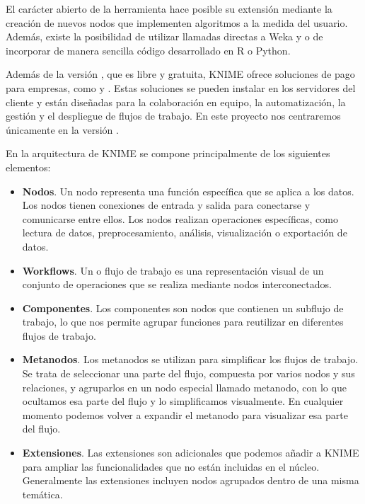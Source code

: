 El carácter abierto de la herramienta hace posible su extensión mediante la creación de nuevos nodos que 
implementen algoritmos a la medida del usuario. Además, existe la posibilidad de utilizar llamadas directas a Weka y 
o de incorporar de manera sencilla código desarrollado en R o Python.
\

Además de la versión , que es libre y gratuita, KNIME ofrece soluciones de pago para empresas, como  
y . Estas soluciones se pueden instalar en los servidores del cliente y están diseñadas para la 
colaboración en equipo, la automatización, la gestión y el despliegue de flujos de trabajo. En este proyecto nos centraremos únicamente
en la versión . 
\

En la arquitectura de KNIME se compone principalmente de los siguientes elementos: 

\begin{itemize}
	\item \textbf{Nodos}. Un nodo representa una función específica que se aplica a los datos. Los nodos tienen conexiones de
	 entrada y salida para conectarse y comunicarse entre ellos. Los nodos realizan operaciones específicas, 
	 como lectura de datos, preprocesamiento, análisis, visualización o exportación de datos. 
	\item \textbf{Workflows}. Un  o flujo de trabajo es una representación visual de un conjunto de operaciones que se realiza 
	mediante nodos interconectados. 
	\item \textbf{Componentes}. Los componentes son nodos que contienen un subflujo de trabajo, lo que nos permite agrupar 
	funciones para reutilizar en diferentes flujos de trabajo. 	
	\item \textbf{Metanodos}. Los metanodos se utilizan para simplificar los flujos de trabajo. Se trata de seleccionar una parte del flujo, 
	compuesta por varios nodos y sus relaciones, y agruparlos en un nodo especial llamado metanodo, con lo que ocultamos esa parte del flujo 
	y lo simplificamos visualmente. En cualquier momento podemos volver a expandir el metanodo para visualizar esa parte del flujo. 
	\item \textbf{Extensiones}. Las extensiones son  adicionales que podemos añadir a KNIME para ampliar las funcionalidades que 
	no están incluidas en el núcleo. Generalmente las extensiones incluyen nodos agrupados dentro de una misma temática. 
\end{itemize}

